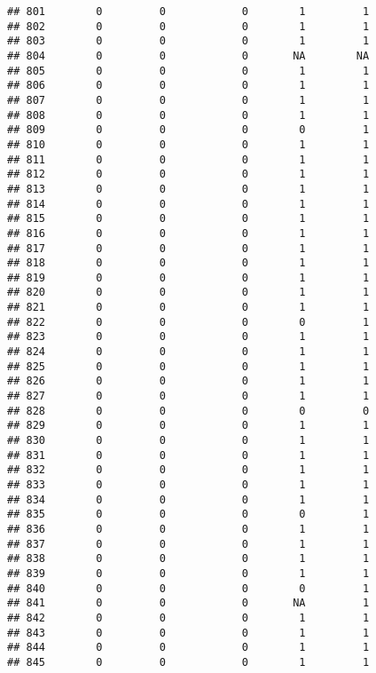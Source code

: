 \documentclass[
]{article}
\begin{document}
\begin{verbatim}
## 801        0         0            0        1         1
## 802        0         0            0        1         1
## 803        0         0            0        1         1
## 804        0         0            0       NA        NA
## 805        0         0            0        1         1
## 806        0         0            0        1         1
## 807        0         0            0        1         1
## 808        0         0            0        1         1
## 809        0         0            0        0         1
## 810        0         0            0        1         1
## 811        0         0            0        1         1
## 812        0         0            0        1         1
## 813        0         0            0        1         1
## 814        0         0            0        1         1
## 815        0         0            0        1         1
## 816        0         0            0        1         1
## 817        0         0            0        1         1
## 818        0         0            0        1         1
## 819        0         0            0        1         1
## 820        0         0            0        1         1
## 821        0         0            0        1         1
## 822        0         0            0        0         1
## 823        0         0            0        1         1
## 824        0         0            0        1         1
## 825        0         0            0        1         1
## 826        0         0            0        1         1
## 827        0         0            0        1         1
## 828        0         0            0        0         0
## 829        0         0            0        1         1
## 830        0         0            0        1         1
## 831        0         0            0        1         1
## 832        0         0            0        1         1
## 833        0         0            0        1         1
## 834        0         0            0        1         1
## 835        0         0            0        0         1
## 836        0         0            0        1         1
## 837        0         0            0        1         1
## 838        0         0            0        1         1
## 839        0         0            0        1         1
## 840        0         0            0        0         1
## 841        0         0            0       NA         1
## 842        0         0            0        1         1
## 843        0         0            0        1         1
## 844        0         0            0        1         1
## 845        0         0            0        1         1

\end{verbatim}
\end{document}
